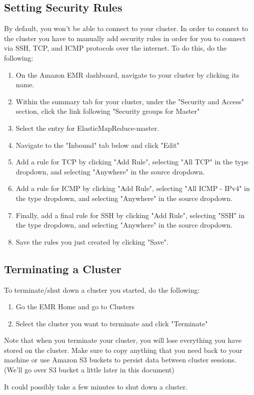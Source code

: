 \documentclass{article}
\begin{document}
\subsection{Setting Security Rules}
\noindent By default, you won't be able to connect to your cluster. In order to connect to the cluster you have to manually add security rules in order for you to connect via SSH, TCP, and ICMP protocols over the internet. To do this, do the following:
\begin{enumerate}
     \item On the Amazon EMR dashboard, navigate to your cluster by clicking its name.
     \item Within the summary tab for your cluster, under the "Security and Access" section, click the link following "Security groups for Master"
     \item Select the entry for ElasticMapReduce-master.
     \item Navigate to the "Inbound" tab below and click "Edit"
     \item Add a rule for TCP by clicking "Add Rule", selecting "All TCP" in the type dropdown, and selecting "Anywhere" in the source dropdown.
     \item Add a rule for ICMP by clicking "Add Rule", selecting "All ICMP - IPv4" in the type dropdown, and selecting "Anywhere" in the source dropdown.
     \item Finally, add a final rule for SSH by clicking "Add Rule", selecting "SSH" in the type dropdown, and selecting "Anywhere" in the source dropdown.
     \item Save the rules you just created by clicking "Save".
\end{enumerate}
\subsection{Terminating a Cluster}
To terminate/shut down a cluster you started, do the following:
\begin{enumerate}
    \item Go the EMR Home and go to Clusters
    \item Select the cluster you want to terminate and click "Terminate"
\end{enumerate}
\begin{info}
Note that when you terminate your cluster, you will lose everything you have stored on the cluster. Make sure to copy anything that you need back to your machine or use Amazon S3 buckets to persist data between cluster sessions. (We'll go over S3 bucket a little later in this document)
\end{info}
\begin{info}
It could possibly take a few minutes to shut down a cluster.
\end{info}
\end{document}
